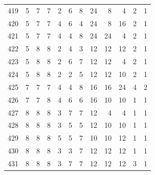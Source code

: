 \documentclass[11pt,a4paper]{article}
\begin{document}
\begin{longtable}{r|rrr|rrr|rrr|rr}
419 & 5 & 7 & 7 & 2 & 6 & 8 & 24 & 8 & 4 & 2 & 1\\
420 & 5 & 7 & 7 & 4 & 6 & 4 & 24 & 8 & 16 & 2 & 1\\
421 & 5 & 7 & 7 & 4 & 4 & 8 & 24 & 24 & 4 & 2 & 1\\
422 & 5 & 8 & 8 & 2 & 4 & 3 & 12 & 12 & 12 & 2 & 1\\
423 & 5 & 8 & 8 & 2 & 6 & 7 & 12 & 12 & 4 & 2 & 1\\
424 & 5 & 8 & 8 & 2 & 2 & 5 & 12 & 12 & 10 & 2 & 1\\
425 & 7 & 7 & 7 & 4 & 4 & 8 & 16 & 16 & 24 & 4 & 2\\
426 & 7 & 7 & 8 & 4 & 6 & 6 & 16 & 10 & 10 & 1 & 1\\
427 & 8 & 8 & 8 & 3 & 7 & 7 & 12 & 4 & 4 & 1 & 1\\
428 & 8 & 8 & 8 & 3 & 5 & 5 & 12 & 10 & 10 & 1 & 1\\
429 & 8 & 8 & 8 & 5 & 5 & 7 & 10 & 10 & 12 & 1 & 1\\
430 & 8 & 8 & 8 & 3 & 3 & 7 & 12 & 12 & 12 & 1 & 1\\
431 & 8 & 8 & 8 & 3 & 7 & 7 & 12 & 12 & 12 & 3 & 1\\
\bottomrule\end{longtable}
\end{document}
